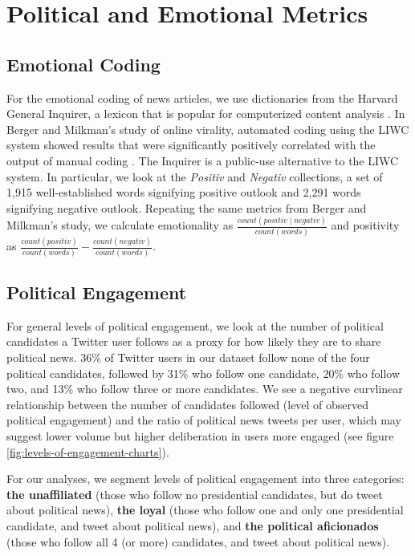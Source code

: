 \documentclass[letterpaper]{article}
\begin{document}
\section{Political and Emotional Metrics}
\subsection{Emotional Coding}
For the emotional coding of news articles, we use dictionaries from the Harvard General Inquirer, a lexicon that is popular for computerized content analysis \cite{stone1963computer}. In Berger and Milkman's study of online virality, automated coding using the LIWC system showed results that were significantly positively correlated with the output of manual coding \cite{berger2012makes}. The Inquirer is a public-use alternative to the LIWC system. In particular, we look at the \emph{Positiv} and \emph{Negativ} collections, a set of 1,915 well-established words signifying positive outlook and 2,291 words signifying negative outlook. Repeating the same metrics from Berger and Milkman's study, we calculate emotionality as $\frac{count(positiv \mid negativ)}{count(words)}$ and positivity as $\frac{count(positiv)}{count(words)} - \frac{count(negativ)}{count(words)}$.

\subsection{Political Engagement}  
For general levels of political engagement, we look at the number of political candidates a Twitter user follows as a proxy for how likely they are to share political news. 36\% of Twitter users in our dataset follow none of the four political candidates, followed by 31\% who follow one candidate, 20\% who follow two, and 13\% who follow three or more candidates. We see a negative curvlinear relationship between the number of candidates followed (level of observed political engagement) and the ratio of political news tweets per user, which may suggest lower volume but higher deliberation in users more engaged (see figure \ref{fig:levels-of-engagement-charts}).

For our analyses, we segment levels of political engagement into three categories: \textbf{the unaffiliated} (those who follow no presidential candidates, but do tweet about political news), \textbf{the loyal} (those who follow one and only one presidential candidate, and tweet about political news), and \textbf{the political aficionados} (those who follow all 4 (or more) candidates, and tweet about political news).  
\end{document}

